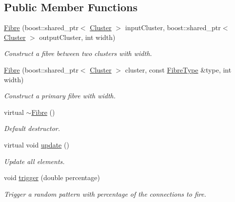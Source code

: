 \subsection*{\-Public \-Member \-Functions}
\begin{DoxyCompactItemize}
\item 
\hyperlink{classcryomesh_1_1structures_1_1Fibre_a03d3ec68b23d465e802f85bbd989550f}{\-Fibre} (boost\-::shared\-\_\-ptr$<$ \hyperlink{classcryomesh_1_1structures_1_1Cluster}{\-Cluster} $>$ input\-Cluster, boost\-::shared\-\_\-ptr$<$ \hyperlink{classcryomesh_1_1structures_1_1Cluster}{\-Cluster} $>$ output\-Cluster, int width)
\begin{DoxyCompactList}\small\item\em \-Construct a fibre between two clusters with width. \end{DoxyCompactList}\item 
\hyperlink{classcryomesh_1_1structures_1_1Fibre_a50d4c7cf2f29d5e27acc057c89eecd84}{\-Fibre} (boost\-::shared\-\_\-ptr$<$ \hyperlink{classcryomesh_1_1structures_1_1Cluster}{\-Cluster} $>$ cluster, const \hyperlink{classcryomesh_1_1structures_1_1Fibre_aecbba6d46a76f888b3722491b674f5e4}{\-Fibre\-Type} \&type, int width)
\begin{DoxyCompactList}\small\item\em \-Construct a primary fibre with width. \end{DoxyCompactList}\item 
virtual \hyperlink{classcryomesh_1_1structures_1_1Fibre_a84a116f316383898b03fb7844dbf8d81}{$\sim$\-Fibre} ()
\begin{DoxyCompactList}\small\item\em \-Default destructor. \end{DoxyCompactList}\item 
virtual void \hyperlink{classcryomesh_1_1structures_1_1Fibre_a1f0b3b6c97d353acc172da31ad9af99f}{update} ()
\begin{DoxyCompactList}\small\item\em \-Update all elements. \end{DoxyCompactList}\item 
void \hyperlink{classcryomesh_1_1structures_1_1Fibre_a84e9a5f2fe92ddbecc8321ad4bddf9a3}{trigger} (double percentage)
\begin{DoxyCompactList}\small\item\em \-Trigger a random pattern with percentage of the connections to fire. \end{DoxyCompactList}\item 

\end{DoxyCompactItemize}
